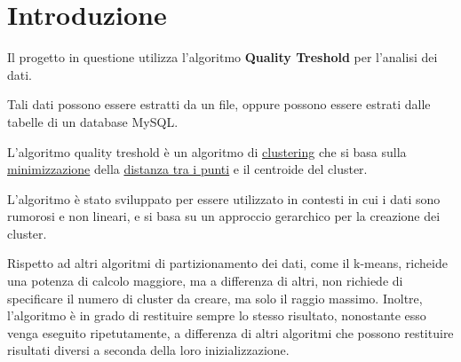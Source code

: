 \section{Introduzione}

Il progetto in questione utilizza l'algoritmo \textbf{Quality Treshold} per l'analisi dei dati.

Tali dati possono essere estratti da un file, oppure possono essere estrati dalle tabelle di un database MySQL. 

L'algoritmo quality treshold è un algoritmo di \underline{clustering} che si basa sulla \underline{minimizzazione} della \underline{distanza tra i punti} e il centroide del cluster. 

L'algoritmo è stato sviluppato per essere utilizzato in contesti in cui i dati sono rumorosi e non lineari, e si basa su un approccio gerarchico per la creazione dei cluster.

Rispetto ad altri algoritmi di partizionamento dei dati, come il k-means, richeide una potenza di calcolo maggiore, ma a differenza di altri, non richiede di specificare il numero di cluster da creare, ma solo il raggio massimo. Inoltre, l'algoritmo è in grado di restituire sempre lo stesso risultato, nonostante esso venga eseguito ripetutamente, a differenza di altri algoritmi che possono restituire risultati diversi a seconda della loro inizializzazione.